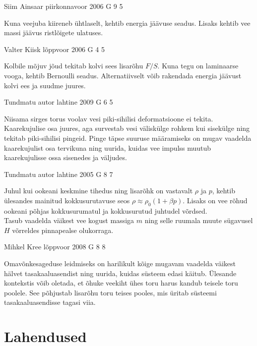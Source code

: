 \documentclass[11pt, twoside]{article}
\begin{document}
{%
{Siim Ainsaar} %
{piirkonnavoor} %
{2006} %
{G 9} %
{5} %
{

\ifHint
Kuna veejuba kiireneb ühtlaselt, kehtib energia jäävuse seadus. Lisaks kehtib vee massi jäävus ristlõigete ulatuses.
\fi
}

{Valter Kiisk} %
{lõppvoor} %
{2006} %
{G 4} %
{5} %
{

\ifHint
Kolbile mõjuv jõud tekitab kolvi sees lisarõhu $F/S$. Kuna tegu on laminaarse vooga, kehtib Bernoulli seadus. Alternatiivselt võib rakendada energia jäävust kolvi ees ja suudme juures.
\fi
}

{Tundmatu autor} %
{lahtine} %
{2009} %
{G 6} %
{5} %
{

\ifHint
Niisama sirges torus voolav vesi piki-sihilisi deformatsioone ei tekita. Kaarekujulise osa juures, aga survestab vesi väliskülge rohkem kui sisekülge ning tekitab piki-sihilisi pingeid. Pinge täpse suuruse määramiseks on mugav vaadelda kaarekujulist osa tervikuna ning uurida, kuidas vee impulss muutub kaarekujulisse ossa sisenedes ja väljudes.
\fi
}

{Tundmatu autor} %
{lahtine} %
{2005} %
{G 8} %
{7} %
{

\ifHint
\osa Juhul kui ookeani keskmine tihedus ning lisarõhk on vastavalt $\rho$ ja $p$, kehtib ülesandes mainitud kokkusurutavuse seos $\rho \approx \rho_0 ( 1 + \beta p)$. Lisaks on vee rõhud ookeani põhjas kokkusurumatul ja kokkusurutud juhtudel võrdsed.\\
\osa Tasub vaadelda väikest vee kogust massiga $m$ ning selle ruumala muute sügavusel $H$ võrreldes pinnapealse olukorraga.
\fi
}

{Mihkel Kree} %
{lõppvoor} %
{2008} %
{G 8} %
{8} %
{

\ifHint
Omavõnkesageduse leidmiseks on harilikult kõige mugavam vaadelda väikest hälvet tasakaaluasendist ning uurida, kuidas süsteem edasi käitub. Ülesande kontekstis võib oletada, et õhuke veekiht ühes toru harus kandub teisele toru poolele. See põhjustab lisarõhu toru teises pooles, mis üritab süsteemi tasakaaluasendisse tagasi viia.
\fi
}
\newpage\section{Lahendused}
        \ToggleSolution
        
}
\end{document}
